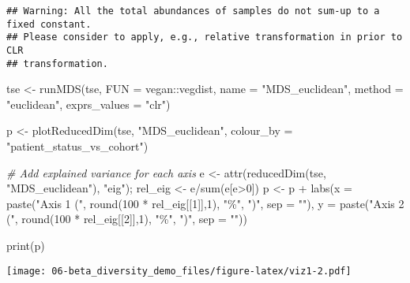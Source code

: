 \documentclass[
  oneside]{book}
\newenvironment{Shaded}{\begin{snugshade}}{\end{snugshade}}
\newcommand{\AttributeTok}[1]{\textcolor[rgb]{0.77,0.63,0.00}{#1}}
\newcommand{\CommentTok}[1]{\textcolor[rgb]{0.56,0.35,0.01}{\textit{#1}}}
\newcommand{\DecValTok}[1]{\textcolor[rgb]{0.00,0.00,0.81}{#1}}
\newcommand{\FunctionTok}[1]{\textcolor[rgb]{0.00,0.00,0.00}{#1}}
\newcommand{\NormalTok}[1]{#1}
\newcommand{\OtherTok}[1]{\textcolor[rgb]{0.56,0.35,0.01}{#1}}
\newcommand{\SpecialCharTok}[1]{\textcolor[rgb]{0.00,0.00,0.00}{#1}}
\newcommand{\StringTok}[1]{\textcolor[rgb]{0.31,0.60,0.02}{#1}}
\begin{document}
\begin{verbatim}
## Warning: All the total abundances of samples do not sum-up to a fixed constant.
## Please consider to apply, e.g., relative transformation in prior to CLR
## transformation.
\end{verbatim}

\begin{Shaded}
\begin{Highlighting}[]
\NormalTok{tse }\OtherTok{\textless{}{-}} \FunctionTok{runMDS}\NormalTok{(tse, }\AttributeTok{FUN =}\NormalTok{ vegan}\SpecialCharTok{::}\NormalTok{vegdist, }\AttributeTok{name =} \StringTok{"MDS\_euclidean"}\NormalTok{,}
              \AttributeTok{method =} \StringTok{"euclidean"}\NormalTok{, }\AttributeTok{exprs\_values =} \StringTok{"clr"}\NormalTok{)}

\NormalTok{p }\OtherTok{\textless{}{-}} \FunctionTok{plotReducedDim}\NormalTok{(tse, }\StringTok{"MDS\_euclidean"}\NormalTok{, }\AttributeTok{colour\_by =} \StringTok{"patient\_status\_vs\_cohort"}\NormalTok{)}

\CommentTok{\# Add explained variance for each axis}
\NormalTok{e }\OtherTok{\textless{}{-}} \FunctionTok{attr}\NormalTok{(}\FunctionTok{reducedDim}\NormalTok{(tse, }\StringTok{"MDS\_euclidean"}\NormalTok{), }\StringTok{"eig"}\NormalTok{);}
\NormalTok{rel\_eig }\OtherTok{\textless{}{-}}\NormalTok{ e}\SpecialCharTok{/}\FunctionTok{sum}\NormalTok{(e[e}\SpecialCharTok{\textgreater{}}\DecValTok{0}\NormalTok{])          }
\NormalTok{p }\OtherTok{\textless{}{-}}\NormalTok{ p }\SpecialCharTok{+} \FunctionTok{labs}\NormalTok{(}\AttributeTok{x =} \FunctionTok{paste}\NormalTok{(}\StringTok{"Axis 1 ("}\NormalTok{, }\FunctionTok{round}\NormalTok{(}\DecValTok{100} \SpecialCharTok{*}\NormalTok{ rel\_eig[[}\DecValTok{1}\NormalTok{]],}\DecValTok{1}\NormalTok{), }\StringTok{"\%"}\NormalTok{, }\StringTok{")"}\NormalTok{, }\AttributeTok{sep =} \StringTok{""}\NormalTok{),}
              \AttributeTok{y =} \FunctionTok{paste}\NormalTok{(}\StringTok{"Axis 2 ("}\NormalTok{, }\FunctionTok{round}\NormalTok{(}\DecValTok{100} \SpecialCharTok{*}\NormalTok{ rel\_eig[[}\DecValTok{2}\NormalTok{]],}\DecValTok{1}\NormalTok{), }\StringTok{"\%"}\NormalTok{, }\StringTok{")"}\NormalTok{, }\AttributeTok{sep =} \StringTok{""}\NormalTok{))}

\FunctionTok{print}\NormalTok{(p)}
\end{Highlighting}
\end{Shaded}

\texttt{[image: 06-beta\_diversity\_demo\_files/figure-latex/viz1-2.pdf]}
\end{document}

